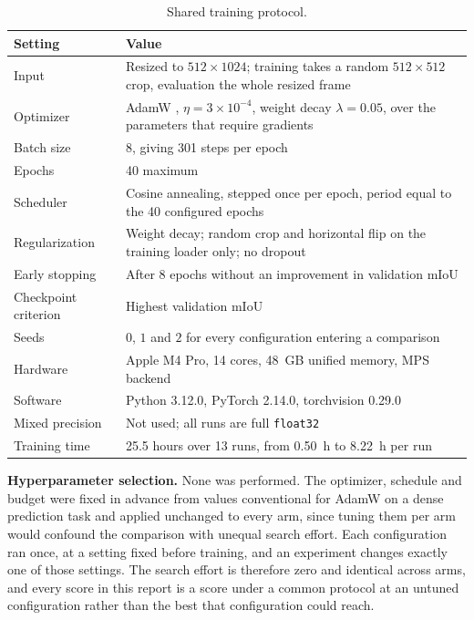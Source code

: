 \begin{table}[H]
\centering
\caption{Shared training protocol.}
\label{tab:protocol}
\begin{tabularx}{\textwidth}{lX}
\hline
\textbf{Setting} & \textbf{Value} \\
\hline
Input                & Resized to $512 \times 1024$; training takes a random $512 \times 512$ crop, evaluation the whole resized frame \\
Optimizer            & AdamW \cite{loshchilov2019adamw}, $\eta = 3 \times 10^{-4}$, weight decay $\lambda = 0.05$, over the parameters that require gradients \\
Batch size           & 8, giving 301 steps per epoch \\
Epochs               & 40 maximum \\
Scheduler            & Cosine annealing, stepped once per epoch, period equal to the 40 configured epochs \\
Regularization       & Weight decay; random crop and horizontal flip on the training loader only; no dropout \\
Early stopping       & After 8 epochs without an improvement in validation mIoU \\
Checkpoint criterion & Highest validation mIoU \\
Seeds                & $0$, $1$ and $2$ for every configuration entering a comparison \\
Hardware             & Apple M4 Pro, 14 cores, 48~GB unified memory, MPS backend \\
Software             & Python 3.12.0, PyTorch 2.14.0, torchvision 0.29.0 \\
Mixed precision      & Not used; all runs are full \texttt{float32} \\
Training time        & 25.5 hours over 13 runs, from 0.50~h to 8.22~h per run \\
\hline
\end{tabularx}
\end{table}

\textbf{Hyperparameter selection.} None was performed. The optimizer, schedule and budget were
fixed in advance from values conventional for AdamW on a dense prediction task and applied
unchanged to every arm, since tuning them per arm would confound the comparison with unequal
search effort. Each configuration ran once, at a setting fixed
before training, and an experiment changes exactly one of those settings. The search effort is
therefore zero and identical across arms, and every score in this report is
a score under a common protocol at an untuned configuration rather than the best that
configuration could reach.

